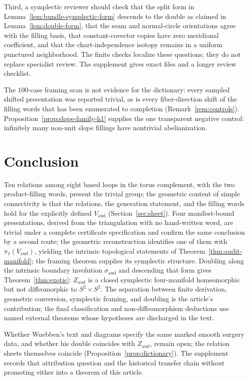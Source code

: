 \documentclass[11pt]{article}
\newcommand{\pione}{\pi_1}
\theoremstyle{definition}
\begin{document}
Third, a symplectic reviewer should check that the split form in
Lemma~\ref{lem:bundle-symplectic-form} descends to the double as claimed in
Lemma~\ref{lem:double-form}, that the seam and normal-circle orientations
agree with the filling basis,
that constant-covector copies have zero meridional coefficient, and that the
chart-independence isotopy remains in a uniform punctured neighborhood.  The
finite checks localize these questions; they do not replace specialist
review.  The supplement gives exact files and a longer review checklist.

The $100$-case framing scan is not evidence for the dictionary: every sampled
shifted presentation was reported trivial, as is every fiber-direction
shift of the filling words that has been enumerated to completion
(Remark~\ref{rem:controls}).  Proposition~\ref{prop:slope-family-h1}
supplies the one transparent negative control: infinitely many non-unit
slope fillings have nontrivial abelianization.

\section{Conclusion}

Ten relations among eight based loops in the torus complement, with the two
product-filling words, present the trivial group; the geometric content of
simple connectivity is that the relations, the generation statement, and
the filling words hold for the explicitly defined $V_{\mathrm{aud}}$
(Section~\ref{sec:sheet}).  Four manifest-bound presentations, derived from
the triangulation with no hand-written word, are trivial under a complete
certificate specification and confirm the same conclusion by a second route;
the geometric reconstruction identifies one of them with
$\pione(V_{\mathrm{aud}})$, yielding the intrinsic topological statements of
Theorem~\ref{thm:audit-manifold}; the framing theorem supplies its
symplectic structure.  Doubling along the intrinsic
boundary involution $\sigma_{\mathrm{aud}}$ and descending that form gives
Theorem~\ref{thm:exotic}: $Z_{\mathrm{aud}}$ is a closed symplectic
four-manifold homeomorphic but not diffeomorphic to $S^2\times S^2$.  The
separation between finite derivation, geometric conversion, symplectic
framing, and doubling is the article's contribution; the final
classification and non-diffeomorphism deductions use named external
theorems whose hypotheses are discharged in the text.

Whether Wuebben's text and diagrams specify the same marked smooth surgery
data, and whether his double coincides with $Z_{\mathrm{aud}}$, remain
open; the relation sheets themselves coincide
(Proposition~\ref{prop:dictionary}).  The supplement records that attribution question and the historical
transfer chain without promoting either into a theorem of this article.
\end{document}
